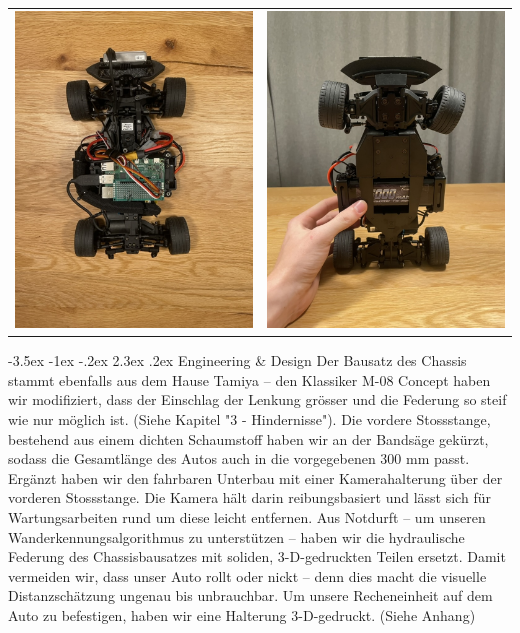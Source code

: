 \documentclass[a4paper]{scrarticle}
\makeatletter
\renewcommand\section{\@startsection {section}{1}{\z@}%
                                   {-3.5ex \@plus -1ex \@minus -.2ex}%
                                   {2.3ex \@plus.2ex}%
                                   {\Huge\AKAfont}}
\makeatother
\begin{document}
\begin{center}
\begin{tabular}{ c c }
		\includegraphics[width=7cm]{top.jpeg} & \includegraphics[width=7cm]{bottom.jpeg}    
	\end{tabular}
\end{center}
\clearpage

\section{Engineering \& Design}
Der Bausatz des Chassis stammt ebenfalls aus dem Hause Tamiya – den Klassiker M-08 Concept haben wir modifiziert, dass der Einschlag der Lenkung grösser und die Federung so steif wie nur möglich ist. (Siehe Kapitel "3 - Hindernisse").
Die vordere Stossstange, bestehend aus einem dichten Schaumstoff haben wir an der Bandsäge gekürzt, sodass die Gesamtlänge des Autos auch in die vorgegebenen 300 mm passt.
Ergänzt haben wir den fahrbaren Unterbau mit einer Kamerahalterung über der vorderen Stossstange. Die Kamera hält darin reibungsbasiert und lässt sich für Wartungsarbeiten rund um diese leicht entfernen.
Aus Notdurft – um unseren Wanderkennungsalgorithmus zu unterstützen – haben wir die hydraulische Federung des Chassisbausatzes mit soliden, 3-D-gedruckten Teilen ersetzt. Damit vermeiden wir, dass unser Auto rollt oder nickt – denn dies macht die visuelle Distanzschätzung ungenau bis unbrauchbar.
Um unsere Recheneinheit auf dem Auto zu befestigen, haben wir eine Halterung 3-D-gedruckt. (Siehe Anhang)
\end{document}
